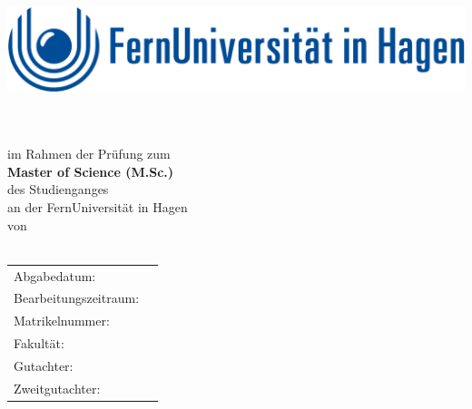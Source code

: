 \thispagestyle{empty}
\begin{titlepage}
\enlargethispage{4cm}

\begin{center}
    \includegraphics[height=2.5cm]{Bilder/Logos/Logo_Uni.png} 
\end{center}
\vspace*{0.1cm}

\begin{center}
	\huge{\textbf{\titel}}\\[1.5cm]
	\Large{\textbf{\arbeit}}\\[0.5cm]
	\normalsize{im Rahmen der Prüfung zum\\[1ex] \textbf{Master of Science (M.Sc.)}}\\[0.5cm]
	\Large{des Studienganges \studiengang}\\[1ex]
	\normalsize{an der FernUniversität in Hagen}\\[1cm]
	\normalsize{von}\\[1ex] \Large{\textbf{\autor}} \\[1cm]
\end{center}

\begin{center}
	\vfill
	\begin{tabular}{ll}
		Abgabedatum:                     & \abgabe \\[0.2cm]
		Bearbeitungszeitraum:            & \bearbeitungszeitraum \\[0.2cm]
		Matrikelnummer:                  & \matrikelnr \\[0.2cm]
		Fakultät:                        & \fakultaet \\[0.2cm]
		Gutachter:                       & \gutachter \\[0.2cm]
		Zweitgutachter:                  & \zweitgutachter \\[2cm]
	\end{tabular} 
\end{center}
\end{titlepage}
